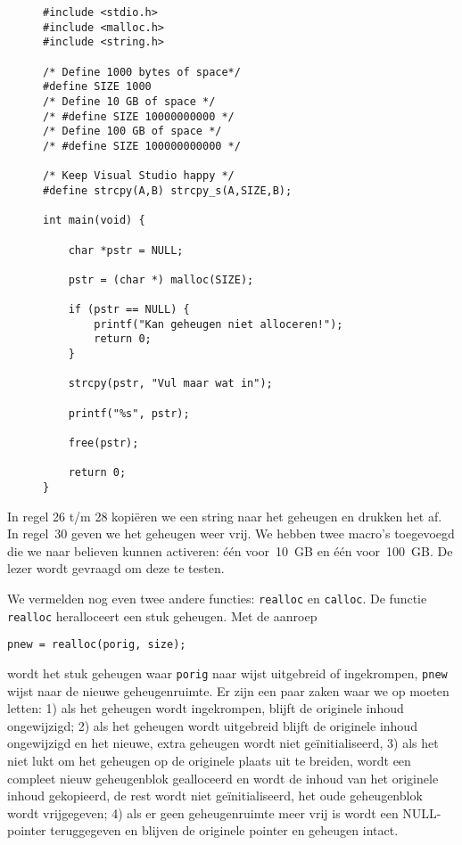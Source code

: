 \begin{figure}[!ht]
\begin{lstlisting}[caption=Gebruik van malloc en free.,label=cod:poimalloc]
#include <stdio.h>
#include <malloc.h>
#include <string.h>

/* Define 1000 bytes of space*/
#define SIZE 1000
/* Define 10 GB of space */
/* #define SIZE 10000000000 */
/* Define 100 GB of space */
/* #define SIZE 100000000000 */

/* Keep Visual Studio happy */
#define strcpy(A,B) strcpy_s(A,SIZE,B);

int main(void) {

	char *pstr = NULL;

	pstr = (char *) malloc(SIZE);

	if (pstr == NULL) {
		printf("Kan geheugen niet alloceren!");
		return 0;
	}

	strcpy(pstr, "Vul maar wat in");

	printf("%s", pstr);

	free(pstr);

	return 0;
}
\end{lstlisting}
\end{figure}

In regel 26 t/m 28 kopiëren we een string naar het geheugen en drukken het af. In regel~30 geven we het geheugen weer vrij. We hebben twee macro's toegevoegd die we naar believen kunnen activeren: één voor~10~GB en één voor~100~GB. De lezer wordt gevraagd om deze te testen.

We vermelden nog even twee andere functies: \texttt{realloc} en \texttt{calloc}. De functie \texttt{realloc} heralloceert een stuk geheugen. Met de aanroep

\hspace*{1em}\texttt{pnew = realloc(porig, size);}

wordt het stuk geheugen waar \texttt{porig} naar wijst uitgebreid of ingekrompen, \texttt{pnew} wijst naar de nieuwe geheugenruimte. Er zijn een paar zaken waar we op moeten letten: 1) als het geheugen wordt ingekrompen, blijft de originele inhoud ongewijzigd; 2) als het geheugen wordt uitgebreid blijft de originele inhoud ongewijzigd en het nieuwe, extra geheugen wordt niet geïnitialiseerd, 3) als het niet lukt om het geheugen op de originele plaats uit te breiden, wordt een compleet nieuw geheugenblok gealloceerd en wordt de inhoud van het originele inhoud gekopieerd, de rest wordt niet geïnitialiseerd, het oude geheugenblok wordt vrijgegeven; 4) als er geen geheugenruimte meer vrij is wordt een NULL-pointer teruggegeven en blijven de originele pointer en geheugen intact.

